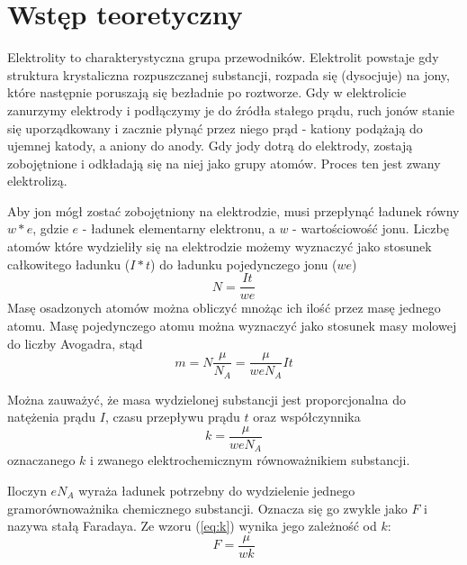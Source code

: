 \documentclass[a4paper,10pt,twoside]{article}
\begin{document}
\section{Wstęp teoretyczny}
Elektrolity to charakterystyczna grupa przewodników. Elektrolit powstaje gdy struktura krystaliczna rozpuszczanej substancji, rozpada się (dysocjuje)
na jony, które następnie poruszają się bezładnie po roztworze. Gdy w elektrolicie zanurzymy elektrody i podłączymy je do źródła stałego prądu,
ruch jonów stanie się uporządkowany i zacznie płynąć przez niego prąd - kationy podążają do ujemnej katody, a aniony do anody.
Gdy jody dotrą do elektrody, zostają zobojętnione i odkładają się na niej jako grupy atomów. Proces ten jest zwany elektrolizą.

Aby jon mógł zostać zobojętniony na elektrodzie, musi przepłynąć ładunek równy $w*e$, gdzie $e$ - ładunek elementarny elektronu, a $w$ - wartościowość jonu.
Liczbę atomów które wydzieliły się na elektrodzie możemy wyznaczyć jako stosunek całkowitego ładunku ($I*t$) do ładunku pojedynczego jonu ($we$)
\begin{equation}
N=\frac{It}{we}
\end{equation}
Masę osadzonych atomów można obliczyć mnożąc ich ilość przez masę jednego atomu. Masę pojedynczego atomu można wyznaczyć jako stosunek masy molowej do
liczby Avogadra, stąd
\begin{equation}
\label{eq:masa}
m=N\frac{\mu}{N_A}=\frac{\mu}{weN_A}It
\end{equation}

Można zauważyć, że masa wydzielonej substancji jest proporcjonalna do natężenia prądu $I$, czasu przepływu prądu $t$ oraz współczynnika 
\begin{equation}
\label{eq:k}
k=\frac{\mu}{weN_A}
\end{equation}
oznaczanego $k$ i zwanego elektrochemicznym równoważnikiem substancji.

Iloczyn $eN_A$ wyraża ładunek potrzebny do wydzielenie jednego gramorównoważnika chemicznego substancji. Oznacza się go zwykle jako $F$ i nazywa stałą Faradaya.
Ze wzoru (\ref{eq:k}) wynika jego zależność od $k$:
\begin{equation}
F=\frac{\mu}{wk}
\end{equation}

\newpage
\end{document}

